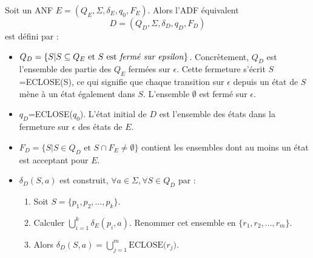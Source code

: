 Soit un ANF $E=(Q_E, \Sigma, \delta_E, q_0, F_E)$. Alors l'ADF équivalent
$$
D=(Q_D, \Sigma, \delta_D, q_D, F_D)
$$
est défini par :
\begin{itemize}
	\item $Q_D = \{S | S \subseteq Q_E \text{ et } S \text{ est \emph{fermé sur epsilon}}\}$. Concrètement, $Q_D$ est l'ensemble des partie des $Q_E$ fermées sur $\epsilon$. Cette fermeture s'écrit $S$=ECLOSE(S), ce qui signifie que chaque transition sur $\epsilon$ depuis un état de $S$ mène à un état également dans $S$. L'ensemble $\emptyset$ est fermé sur $\epsilon$.
	\item $q_D$=ECLOSE($q_0$). L'état initial de $D$ est l'ensemble des états dans la fermeture sur $\epsilon$ des états de $E$.
	\item $F_D= \{S|S \in Q_D \text{ et } S \cap F_E \neq \emptyset\}$ contient les ensembles dont au moins un état est acceptant pour $E$.
	\item $\delta_D(S,a)$ est construit, $\forall a \in \Sigma, \forall S \in Q_D$ par :
		\begin{enumerate}
			\item Soit $S=\{p_1, p_2,\dots,p_k\}$.
			\item Calculer $\bigcup_{i=1}^k\delta_E(p_i,a)$. Renommer cet ensemble en $\{r_1, r_2, \dots, r_m\}$.
			\item Alors $\delta_D(S,a)=\bigcup_{j=1}^m\text{ECLOSE(}r_j\text{)}$.
		\end{enumerate}
\end{itemize}



